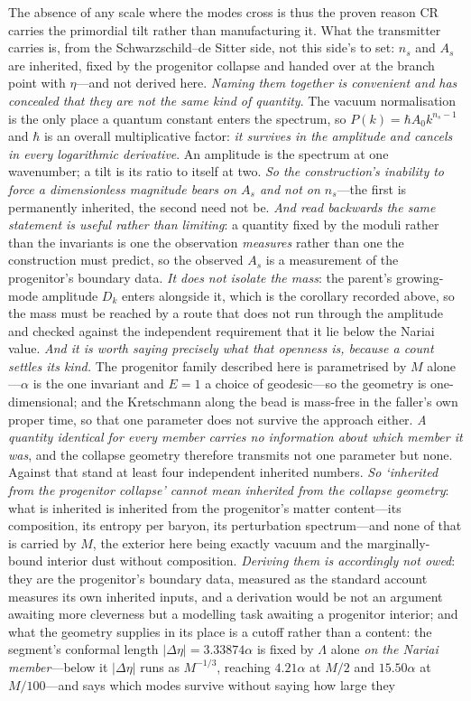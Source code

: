 \documentclass[11pt,a4paper]{article}
\theoremstyle{plain}
\theoremstyle{definition}
\theoremstyle{remark}
\begin{document}
The absence of any scale where the modes cross is thus the proven reason CR carries the primordial tilt rather than manufacturing it. What the transmitter carries is, from the Schwarzschild--de Sitter side, not this side's to set: $n_s$ and $A_s$ are inherited, fixed by the progenitor collapse and handed over at the branch point with $\eta$---and not derived here. \emph{Naming them together is convenient and has concealed that they are not the same kind of quantity}. The vacuum normalisation is the only place a quantum constant enters the spectrum, so $P(k)=\hbar A_0k^{n_s-1}$ and $\hbar$ is an overall multiplicative factor: \emph{it survives in the amplitude and cancels in every logarithmic derivative}. An amplitude is the spectrum at one wavenumber; a tilt is its ratio to itself at two. \emph{So the construction's inability to force a dimensionless magnitude bears on $A_s$ and not on $n_s$}---the first is permanently inherited, the second need not be. \emph{And read backwards the same statement is useful rather than limiting}: a quantity fixed by the moduli rather than the invariants is one the observation \emph{measures} rather than one the construction must predict, so the observed $A_s$ is a measurement of the progenitor's boundary data. \emph{It does not isolate the mass}: the parent's growing-mode amplitude $D_k$ enters alongside it, which is the corollary recorded above, so the mass must be reached by a route that does not run through the amplitude and checked against the independent requirement that it lie below the Nariai value. \emph{And it is worth saying precisely what that openness is, because a count settles its kind.} The progenitor family described here is parametrised by $M$ alone---$\alpha$ is the one invariant and $E=1$ a choice of geodesic---so the geometry is one-dimensional; and the Kretschmann along the bead is mass-free in the faller's own proper time, so that one parameter does not survive the approach either. \emph{A quantity identical for every member carries no information about which member it was}, and the collapse geometry therefore transmits not one parameter but none. Against that stand at least four independent inherited numbers. \emph{So `inherited from the progenitor collapse' cannot mean inherited from the collapse geometry}: what is inherited is inherited from the progenitor's matter content---its composition, its entropy per baryon, its perturbation spectrum---and none of that is carried by $M$, the exterior here being exactly vacuum and the marginally-bound interior dust without composition. \emph{Deriving them is accordingly not owed}: they are the progenitor's boundary data, measured as the standard account measures its own inherited inputs, and a derivation would be not an argument awaiting more cleverness but a modelling task awaiting a progenitor interior; and what the geometry supplies in its place is a cutoff rather than a content: the segment's conformal length $\lvert\Delta\eta\rvert=3.33874\alpha$ is fixed by $\Lambda$ alone \emph{on the Nariai member}---below it $|\Delta\eta|$ runs as $M^{-1/3}$, reaching $4.21\alpha$ at $M/2$ and $15.50\alpha$ at $M/100$---and says which modes survive without saying how large they 
\end{document}
